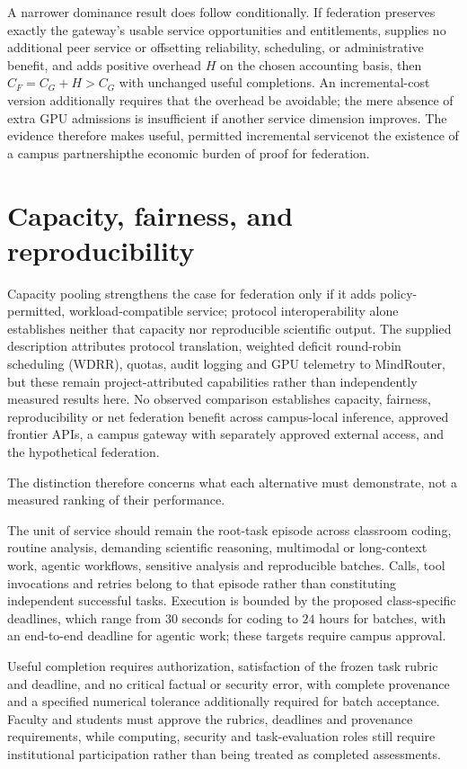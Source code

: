 \documentclass[11pt]{article}
\begin{document}
A narrower dominance result does follow conditionally. If federation preserves exactly the gateway's usable service opportunities and entitlements, supplies no additional peer service or offsetting reliability, scheduling, or administrative benefit, and adds positive overhead $H$ on the chosen accounting basis, then $C_F=C_G+H>C_G$ with unchanged useful completions. An incremental-cost version additionally requires that the overhead be avoidable; the mere absence of extra GPU admissions is insufficient if another service dimension improves. The evidence therefore makes useful, permitted incremental service\textemdash{}not the existence of a campus partnership\textemdash{}the economic burden of proof for federation.

\section{Capacity, fairness, and reproducibility}
Capacity pooling strengthens the case for federation only if it adds policy-permitted, workload-compatible service; protocol interoperability alone establishes neither that capacity nor reproducible scientific output. The supplied description attributes protocol translation, weighted deficit round-robin scheduling (WDRR), quotas, audit logging and GPU telemetry to MindRouter, but these remain project-attributed capabilities rather than independently measured results here. No observed comparison establishes capacity, fairness, reproducibility or net federation benefit across campus-local inference, approved frontier APIs, a campus gateway with separately approved external access, and the hypothetical federation.

The distinction therefore concerns what each alternative must demonstrate, not a measured ranking of their performance.

The unit of service should remain the root-task episode across classroom coding, routine analysis, demanding scientific reasoning, multimodal or long-context work, agentic workflows, sensitive analysis and reproducible batches. Calls, tool invocations and retries belong to that episode rather than constituting independent successful tasks. Execution is bounded by the proposed class-specific deadlines, which range from $30$ seconds for coding to $24$ hours for batches, with an end-to-end deadline for agentic work; these targets require campus approval.

Useful completion requires authorization, satisfaction of the frozen task rubric and deadline, and no critical factual or security error, with complete provenance and a specified numerical tolerance additionally required for batch acceptance. Faculty and students must approve the rubrics, deadlines and provenance requirements, while computing, security and task-evaluation roles still require institutional participation rather than being treated as completed assessments.
\end{document}
